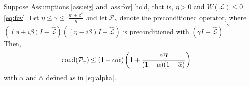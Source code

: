 \documentclass[review]{siamart}
\begin{document}
%
\begin{theorem}\label{th:cond}
Suppose Assumptions \ref{ass:eig} and \ref{ass:fov} hold, that is, $\eta > 0$
and $W(\mathcal{L}) \leq 0$ \eqref{eq:fov}. Let $\eta \leq \gamma \leq \
\tfrac{\eta^2+\beta^2}{\eta}$ and let
$\mathcal{P}_\gamma$ denote the preconditioned operator, where $((\eta + i\beta)I -
\widehat{\mathcal{L}})((\eta - i\beta)I - \widehat{\mathcal{L}})$ is
preconditioned with $(\gamma I - \widehat{\mathcal{L}})^{-2}$. Then,
\begin{align}\label{eq:cond1}
\textnormal{cond}(\mathcal{P}_\gamma) \leq (1 + \alpha\overline{\alpha})
		\left(1 + \frac{\alpha\overline{\alpha}}{(1 - \alpha)(1 - \overline{\alpha})}\right)
\end{align}
with $\alpha$ and $\overline{\alpha}$ defined as in \eqref{eq:alpha}.
\end{theorem}
\end{document}
